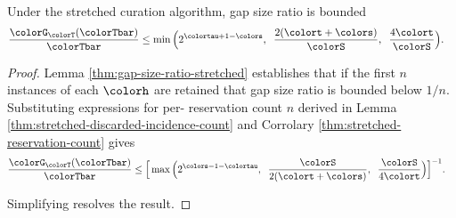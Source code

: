 \begin{theorem}
\label{thm:stretched-gap-size}
Under the stretched curation algorithm, gap size ratio is bounded
\begin{align*}
\frac{\colorG_{\colorT}(\colorTbar)}{\colorTbar}
&\leq
\min\Big(
  2^{\colortau+1-\colors},\;\;
  \frac{2(\colort + \colors)}{\colorS},\;\;
  \frac{4\colort}{\colorS}
\Big).
\end{align*}
\end{theorem}
\begin{proof}

Lemma \ref{thm:gap-size-ratio-stretched} establishes that if the first $n$ instances of each \hv{} $\colorh$ are retained that gap size ratio is bounded below $1/n$.
Substituting expressions for per-\hv{} reservation count $n$ derived in Lemma \ref{thm:stretched-discarded-incidence-count} and Corrolary \ref{thm:stretched-reservation-count} gives
\begin{align*}
  \frac{\colorG_{\colorT}(\colorTbar)}{\colorTbar}
  &\leq
  \Big[
    \max\Big(
      2^{\colors - 1 - \colortau},\;\;
      \frac{\colorS}{2(\colort + \colors)},\;\;
      \frac{\colorS}{4\colort}
    \Big)
  \Big]^{-1}.
\end{align*}

Simplifying resolves the result.

\end{proof}
